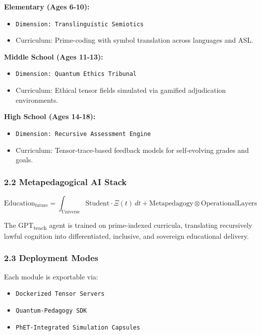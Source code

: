 \documentclass[12pt]{article}
\begin{document}
\textbf{Elementary (Ages 6-10):}  
\begin{itemize}
    \item \texttt{Dimension: Translinguistic Semiotics}  
    \item Curriculum: Prime-coding with symbol translation across languages and ASL.
\end{itemize}

\textbf{Middle School (Ages 11-13):}  
\begin{itemize}
    \item \texttt{Dimension: Quantum Ethics Tribunal}  
    \item Curriculum: Ethical tensor fields simulated via gamified adjudication environments.
\end{itemize}

\textbf{High School (Ages 14-18):}  
\begin{itemize}
    \item \texttt{Dimension: Recursive Assessment Engine}  
    \item Curriculum: Tensor-trace-based feedback models for self-evolving grades and goals.
\end{itemize}

\subsubsection{2.2 Metapedagogical AI Stack}

\begin{equation}
\text{Education}_{\text{future}} = \int_{\text{Universe}} \text{Student} \cdot \Xi(t) \,dt + \text{Metapedagogy} \otimes \text{OperationalLayers}
\end{equation}

The GPT\textsubscript{teach} agent is trained on prime-indexed curricula, translating recursively lawful cognition into differentiated, inclusive, and sovereign educational delivery.

\subsubsection{2.3 Deployment Modes}

Each module is exportable via:
\begin{itemize}
    \item \texttt{Dockerized Tensor Servers}
    \item \texttt{Quantum-Pedagogy SDK}
    \item \texttt{PhET-Integrated Simulation Capsules}
\end{itemize}
\end{document}
